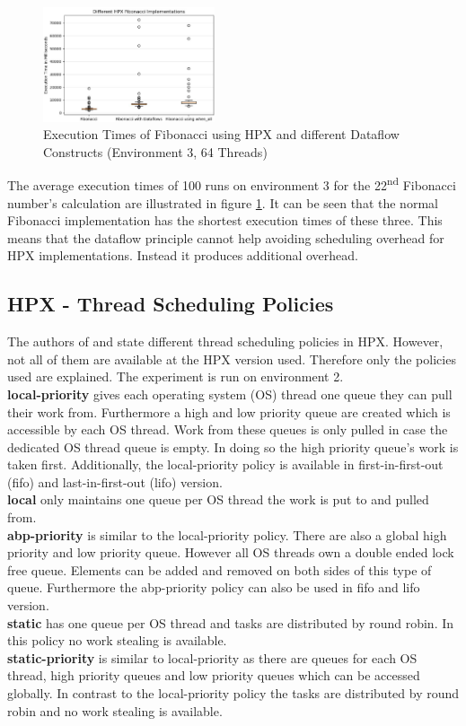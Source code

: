 \begin{figure}[h]
	\centering
	\includegraphics[width=0.45\textwidth]{figures/fibDataflow.JPG}
	\caption{Execution Times of Fibonacci using HPX and different Dataflow Constructs (Environment 3, 64 Threads)}
	\label{fig:fib_dataflow}
\end{figure}

The average execution times of 100 runs on environment 3 for the 22\textsuperscript{nd} Fibonacci number's calculation are illustrated in figure \ref{fig:fib_dataflow}.
It can be seen that the normal Fibonacci implementation has the shortest execution times of these three.
This means that the dataflow principle cannot help avoiding scheduling overhead for HPX implementations.
Instead it produces additional overhead.


\subsection{HPX - Thread Scheduling Policies}
 The authors of \cite{hpxMP.2019} and \cite{TheSTEARGroup.2020} state different thread scheduling policies in HPX.
 However, not all of them are available at the HPX version used.
 Therefore only the policies used are explained.
 The experiment is run on environment 2.\\
 \textbf{local-priority} gives each operating system (OS) thread one queue they can pull their work from.
 Furthermore a high and low priority queue are created which is accessible by each OS thread.
 Work from these queues is only pulled in case the dedicated OS thread queue is empty.
 In doing so the high priority queue's work is taken first.
 Additionally, the local-priority policy is available in first-in-first-out (fifo) and last-in-first-out (lifo) version.\\
 \textbf{local} only maintains one queue per OS thread the work is put to and pulled from.\\
 \textbf{abp-priority} is similar to the local-priority policy.
 There are also a global high priority and low priority queue.
 However all OS threads own a double ended lock free queue.
 Elements can be added and removed on both sides of this type of queue.
 Furthermore the abp-priority policy can also be used in fifo and lifo version.\\
 \textbf{static} has one queue per OS thread and tasks are distributed by round robin.
 In this policy no work stealing is available.\\
 \textbf{static-priority} is similar to local-priority as there are queues for each OS thread, high priority queues and low priority queues which can be accessed globally.
 In contrast to the local-priority policy the tasks are distributed by round robin and no work stealing is available.

